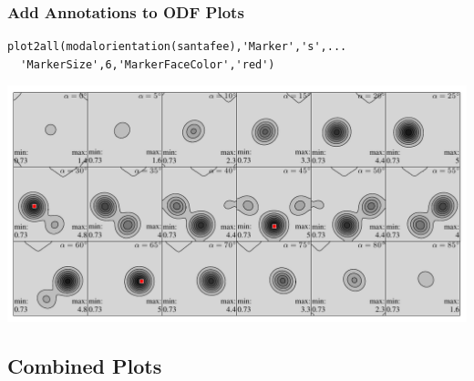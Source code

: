 \documentclass{beamer}
\begin{document}
\begin{frame}[fragile]
  \frametitle{Add Annotations to ODF Plots}

  
\begin{lstlisting}
plot2all(modalorientation(santafee),'Marker','s',...
  'MarkerSize',6,'MarkerFaceColor','red')
\end{lstlisting}
  
\includegraphics[width=\textwidth]{pic/odfanotate}

\end{frame}

\subsection*{Combined Plots}
\end{document}
